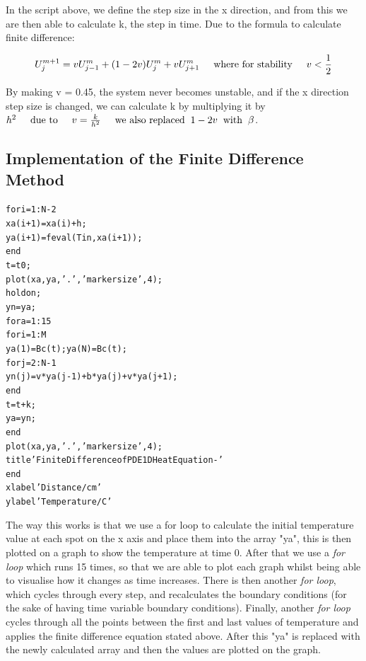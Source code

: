 \documentclass[11pt,a4paper]{article}
\begin{document}
In the script above, we define the step size in the x direction, and from this we are then able to calculate k, the step in time. Due to the formula to calculate finite difference:

\[U^{m+1}_j = vU^m_{j-1} +(1-2v)U^m_{j}+vU^m_{j+1} \hspace{5mm} \text{where for stability} \hspace{5mm} v < \frac{1}{2}\]

By making v = 0.45, the system never becomes unstable, and if the x direction step size is changed, we can calculate k by multiplying it by $h^2 \hspace{5mm} \text{due to} \hspace{5mm} v = \frac{k}{h^2} \hspace{5mm} \text{we also replaced} \hspace{2mm} 1-2v \hspace{2mm} \text{with} \hspace{2mm} \beta $.

\subsection{Implementation of the Finite Difference Method}

\begin{alltt}
for i = 1:N-2
    xa(i+1) = xa(i) + h; %
    ya(i+1) = feval(Tin, xa(i+1)); %
end
t = t0; %
plot(xa, ya, '.', 'markersize', 4); %
hold on; %
yn = ya; %
for a = 1:15 %
    for i = 1:M %
        ya(1) = Bc(t); ya(N) = Bc(t); %
	       for j = 2:N-1 %
           yn(j) = v*ya(j-1) + b*ya(j) + v*ya(j+1);
	       end
        t = t+k; %
        ya = yn; %
    end
    plot(xa, ya, '.', 'markersize', 4); %
    title 'Finite Difference of PDE 1D Heat Equation - '
end
xlabel 'Distance/cm'
ylabel 'Temperature/C'
\end{alltt}

The way this works is that we use a for loop to calculate the initial temperature value at each spot on the x axis and place them into the array "ya", this is then plotted on a graph to show the temperature at time 0. After that we use a \textit{for loop} which runs 15 times, so that we are able to plot each graph whilst being able to visualise how it changes as time increases. There is then another \textit{for loop}, which cycles through every step, and recalculates the boundary conditions (for the sake of having time variable boundary conditions). Finally, another \textit{for loop} cycles through all the points between the first and last values of temperature and applies the finite difference equation stated above. After this "ya" is replaced with the newly calculated array and then the values are plotted on the graph.
\end{document}
